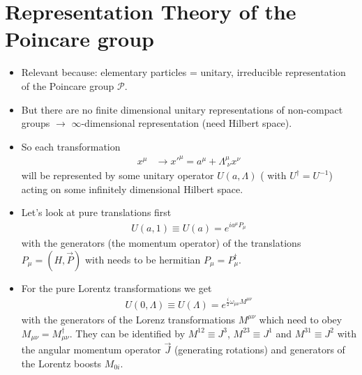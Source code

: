 \documentclass[10pt,a4paper]{book}
\theoremstyle{definition}
\begin{document}
\section{Representation Theory of the Poincare group}
\begin{itemize}
\item Relevant because: elementary particles  = unitary, irreducible representation of the Poincare group $\mathcal{P}$.

\item But there are no finite dimensional unitary representations of non-compact groups $\rightarrow$ $\infty$-dimensional representation (need Hilbert space).

\item So each transformation
\begin{align}
x^\mu&\rightarrow x'^{\mu}=a^\mu+\Lambda^\mu_{\;\nu}x^\nu
\end{align}
will be represented by some unitary operator $U(a,\Lambda)$ ( with $U^\dagger=U^{-1}$) acting on some infinitely dimensional Hilbert space.

\item Let's look at pure translations first
\begin{align}
U(a,1)\equiv U(a)=e^{ia^\mu P_\mu}
\end{align}
with the generators (the momentum operator) of the translations $P_\mu=(H,\vec{P})$ with needs to be hermitian $P_\mu=P^\dagger_\mu$.
\item For the pure Lorentz transformations we get
\begin{align}
U(0,\Lambda)\equiv U(\Lambda)=e^{\frac{i}{2}\omega_{\mu\nu} M^{\mu\nu}}
\end{align}
with the generators of the Lorenz transformations $M^{\mu\nu}$ which need to obey $M_{\mu\nu}=M^\dagger_{\mu\nu}$. They can be identified by $M^{12}\equiv J^3$, $M^{23}\equiv J^1$ and $M^{31}\equiv J^2$ with the angular momentum operator $\vec{J}$ (generating rotations) and generators of the Lorentz boosts $M_{0i}$.


\end{itemize}
\end{document}
